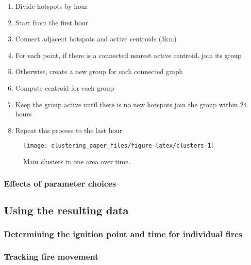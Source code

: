\begin{enumerate}
\def\labelenumi{\arabic{enumi}.}
\tightlist
\item
  Divide hotspots by hour
\item
  Start from the first hour
\item
  Connect adjacent hotspots and active centroids (3km)
\item
  For each point, if there is a connected nearest active centroid, join
  its group
\item
  Otherwise, create a new group for each connected graph
\item
  Compute centroid for each group
\item
  Keep the group active until there is no new hotspots join the group
  within 24 hours
\item
  Repeat this process to the last hour
\end{enumerate}

\begin{Schunk}
\begin{figure}
\texttt{[image: clustering\_paper\_files/figure-latex/clusters-1]} \caption[Main clusters in one area over time]{Main clusters in one area over time.}\label{fig:clusters}
\end{figure}
\end{Schunk}

\hypertarget{effects-of-parameter-choices}{%
\subsubsection{Effects of parameter
choices}\label{effects-of-parameter-choices}}

\hypertarget{using-the-resulting-data}{%
\subsection{Using the resulting data}\label{using-the-resulting-data}}

\hypertarget{determining-the-ignition-point-and-time-for-individual-fires}{%
\subsubsection{Determining the ignition point and time for individual
fires}\label{determining-the-ignition-point-and-time-for-individual-fires}}

\hypertarget{tracking-fire-movement}{%
\subsubsection{Tracking fire movement}\label{tracking-fire-movement}}

